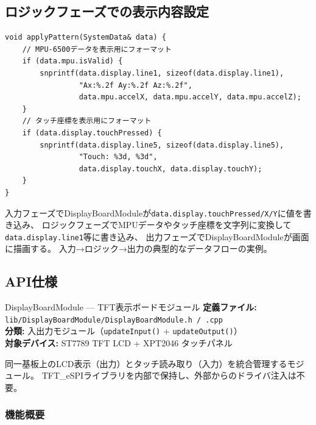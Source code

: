 \subsection{ロジックフェーズでの表示内容設定}

\begin{lstlisting}[style=cppstyle, caption={main.cpp — applyPattern()での表示設定}]
void applyPattern(SystemData& data) {
    // MPU-6500データを表示用にフォーマット
    if (data.mpu.isValid) {
        snprintf(data.display.line1, sizeof(data.display.line1),
                 "Ax:%.2f Ay:%.2f Az:%.2f",
                 data.mpu.accelX, data.mpu.accelY, data.mpu.accelZ);
    }
    // タッチ座標を表示用にフォーマット
    if (data.display.touchPressed) {
        snprintf(data.display.line5, sizeof(data.display.line5),
                 "Touch: %3d, %3d",
                 data.display.touchX, data.display.touchY);
    }
}
\end{lstlisting}

\begin{pointbox}[3フェーズモデルのデータフロー]
入力フェーズでDisplayBoardModuleが\texttt{data.display.touchPressed/X/Y}に値を書き込み、
ロジックフェーズでMPUデータやタッチ座標を文字列に変換して\texttt{data.display.line1}等に書き込み、
出力フェーズでDisplayBoardModuleが画面に描画する。
入力→ロジック→出力の典型的なデータフローの実例。
\end{pointbox}

\subsection{API仕様}


\begin{apibox}{DisplayBoardModule --- TFT表示ボードモジュール}
\textbf{定義ファイル:} \texttt{lib/DisplayBoardModule/DisplayBoardModule.h / .cpp}\\
\textbf{分類:} 入出力モジュール（\texttt{updateInput()} + \texttt{updateOutput()}）\\
\textbf{対象デバイス:} ST7789 TFT LCD + XPT2046 タッチパネル

同一基板上のLCD表示（出力）とタッチ読み取り（入力）を統合管理するモジュール。
TFT\_eSPIライブラリを内部で保持し、外部からのドライバ注入は不要。
\end{apibox}

\subsubsection{機能概要}

